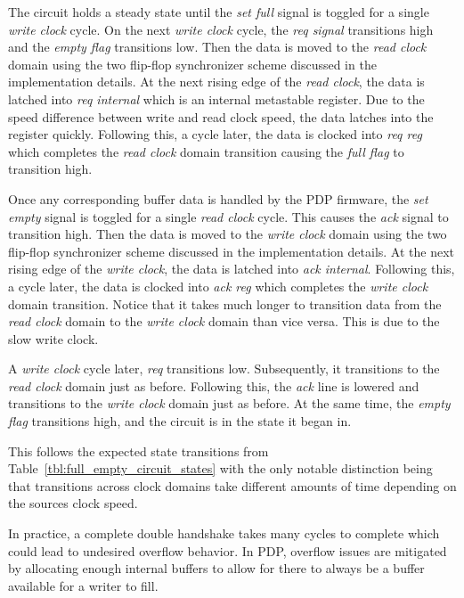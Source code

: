         The circuit holds a steady state until the {\it set full} signal is toggled for a single {\it write clock} cycle. On the next {\it write clock} cycle, the {\it req signal} transitions high and the {\it empty flag} transitions low. Then the data is moved to the {\it read clock} domain using the two flip-flop synchronizer scheme discussed in the implementation details. At the next rising edge of the {\it read clock}, the data is latched into {\it req internal} which is an internal metastable register. Due to the speed difference between write and read clock speed, the data latches into the register quickly. Following this, a cycle later, the data is clocked into {\it req reg} which completes the {\it read clock} domain transition causing the {\it full flag} to transition high.

        Once any corresponding buffer data is handled by the PDP firmware, the {\it set empty} signal is toggled for a single {\it read clock} cycle. This causes the {\it ack} signal to transition high. Then the data is moved to the {\it write clock} domain using the two flip-flop synchronizer scheme discussed in the implementation details. At the next rising edge of the {\it write clock}, the data is latched into {\it ack internal}. Following this, a cycle later, the data is clocked into {\it ack reg} which completes the {\it write clock} domain transition. Notice that it takes much longer to transition data from the {\it read clock} domain to the {\it write clock} domain than vice versa. This is due to the slow write clock.

        A {\it write clock} cycle later, {\it req} transitions low. Subsequently, it transitions to the {\it read clock} domain just as before. Following this, the {\it ack} line is lowered and transitions to the {\it write clock} domain just as before. At the same time, the {\it empty flag} transitions high, and the circuit is in the state it began in.

        This follows the expected state transitions from Table~\ref{tbl:full_empty_circuit_states} with the only notable distinction being that transitions across clock domains take different amounts of time depending on the sources clock speed.

        In practice, a complete double handshake takes many cycles to complete which could lead to undesired overflow behavior. In PDP, overflow issues are mitigated by allocating enough internal buffers to allow for there to always be a buffer available for a writer to fill.

